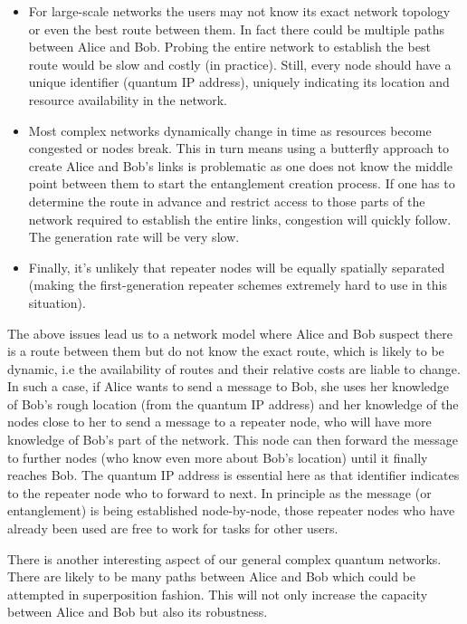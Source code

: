 \begin{itemize}
\item For large-scale networks the users may not know its exact network topology or even the best route between them. In fact there could be multiple paths between Alice and Bob. Probing the entire network to establish the best route would be slow and costly (in practice). Still, every node should have a unique identifier (quantum IP address), uniquely indicating its location and resource availability in the network.
\item Most complex networks dynamically change in time as resources become congested or nodes break. This in turn means using a butterfly approach to create Alice and Bob's links is problematic as one does not know the middle point between them to start the entanglement creation process. If one has to determine the route in advance and restrict access to those parts of the network required to establish the entire links, congestion will quickly follow. The generation rate will be very slow. 
\item Finally, it's unlikely that repeater nodes will be equally spatially separated (making the first-generation repeater schemes extremely hard to use in this situation). 
\end{itemize}

The above issues lead us to a network model where Alice and Bob suspect there is a route between them but do not know the exact route, which is likely to be dynamic, i.e the availability of routes and their relative costs are liable to change. In such a case, if Alice wants to send a message to Bob, she uses her knowledge of Bob's rough location (from the quantum IP address) and her knowledge of the nodes close to her to send a message to a repeater node, who will have more knowledge of Bob's part of the network. This node can then forward the message to further nodes (who know even more about Bob's location) until it finally reaches Bob. The quantum IP address is essential here as that identifier indicates to the repeater node who to forward to next. In principle as the message (or entanglement) is being established node-by-node, those repeater nodes who have already been used are free to work for tasks for other users. 

There is another interesting aspect of our general complex quantum networks. There are likely to be many paths between Alice and Bob which could be attempted in superposition fashion. This will not only increase the capacity between Alice and Bob but also its robustness.

